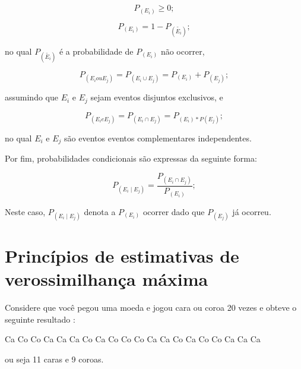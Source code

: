 \begin{refsection}
\begin{center}
\begin{equation}
P_{(E_{i})} \geq 0;
\end{equation}
\end{center}

\begin{center}
\begin{equation}
P_{(E_{i})} = 1 - P_{(\tilde{E_{i}})};
\end{equation}
\end{center}

no qual $P_{(\tilde{E_{i}})}$ é a probabilidade de $P_{(E_{i})}$ não ocorrer,

\begin{center}
\begin{equation}
P_{(E_{i} { }ou{ } E_{j})} = P_{(E_{i} \cup E_{j})} = P_{(E_{i})} + P_{(E_{j})};
\end{equation}
\end{center}

assumindo que $E_{i}$ e $E_{j}$ sejam eventos disjuntos exclusivos, e

\begin{center}
\begin{equation}\label{eq:mult}
P_{(E_{i} e E_{j})} = P_{(E_{i} \cap E_{j})} = P_{(E_{i}) * P(E_{j})};
\end{equation}
\end{center}

no qual $E_{i}$ e $E_{j}$ são eventos eventos complementares independentes.

Por fim, probabilidades condicionais são expressas da seguinte forma:

\begin{center}
\begin{equation}
P_{(E_{i} \mid E_{j})} = \frac{P_{(E_{i} \cap E_{j})}}{P_{(E_{i})}};
\end{equation}
\end{center}

Neste caso, $P_{(E_{i} \mid E_{j})}$ denota a $P_{(E_{i})}$ ocorrer dado que $P_{(E_{j})}$ já ocorreu.
\\

\section{Princípios de estimativas de verossimilhança máxima}\label{tut12:estimate_ml}

Considere que você pegou uma moeda e jogou cara ou coroa 20 vezes e obteve o seguinte resultado \parencite[o mesmo exemplo é dado utilizando dictribuição binomial no Apêndice A de][]{anderson_2008}:
\begin{center}
Ca Co Co Ca Ca Ca Co Ca Co Co Co Ca Ca Co Ca Co Co Ca Ca Ca
\end{center}
ou seja 11 caras e 9 coroas. 


\end{refsection}
